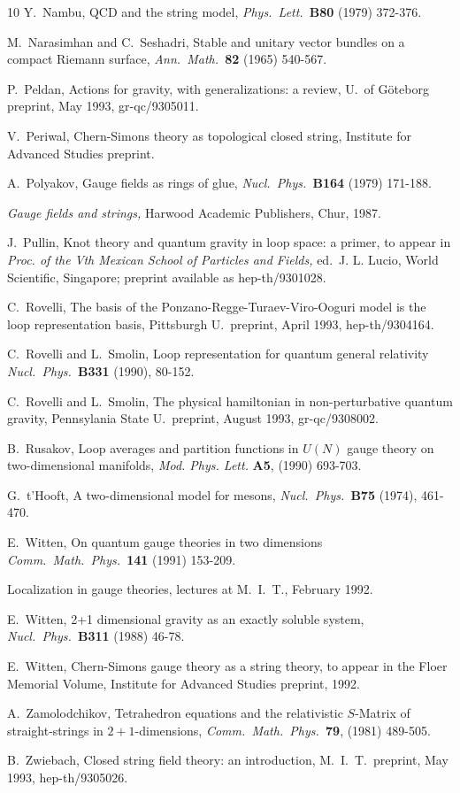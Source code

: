 \documentclass[12pt]{article}
\begin{document}
\begin{thebibliography} {10}
 Y.\ Nambu, QCD and the string model, {\sl Phys.\ Lett.\
}{\bf B80} (1979) 372-376.

 M.\ Narasimhan and C.\ Seshadri, Stable and unitary vector
bundles on a compact Riemann surface, {\sl Ann.\ Math.\ }{\bf 82} (1965)
540-567.

 P.\ Peldan, Actions for gravity, with generalizations:
a review, U.\ of G\"oteborg preprint, May 1993, gr-qc/9305011.

 V.\ Periwal, Chern-Simons theory as topological closed
string, Institute for Advanced Studies preprint.

 A.\ Polyakov, Gauge fields as rings of glue, {\sl
Nucl.\ Phys.\ }{\bf  B164} (1979) 171-188.

{\sl Gauge fields and strings,} Harwood Academic Publishers, Chur, 1987.

  J.\ Pullin, Knot theory and quantum gravity in loop
space: a primer, to appear in {\sl Proc. of the Vth Mexican School of
Particles and Fields,} ed.\ J. L. Lucio, World Scientific, Singapore;
preprint available as hep-th/9301028.

 C.\ Rovelli, The basis of the
Ponzano-Regge-Turaev-Viro-Ooguri model is the loop representation basis,
Pittsburgh U.\ preprint, April 1993, hep-th/9304164.

  C.\ Rovelli and L.\ Smolin, Loop representation for
quantum general relativity {\sl Nucl.\ Phys.\ }{\bf B331} (1990),
80-152.

C.\ Rovelli and L.\ Smolin,
The physical hamiltonian in non-perturbative quantum gravity, Pennsylania
State U.\ preprint, August 1993, gr-qc/9308002.

  B.\ Rusakov, Loop averages and partition functions in
$U(N)$ gauge theory on two-dimensional manifolds, {\em Mod. Phys. Lett.}
{\bf A5}, (1990) 693-703.

 G.\ t'Hooft, A two-dimensional model for mesons, {\sl
Nucl.\ Phys.\ }{\bf B75} (1974), 461-470.

  E.\  Witten, On quantum gauge theories in two
dimensions {\sl Comm.\ Math.\ Phys.\ }{\bf 141} (1991) 153-209.

Localization in gauge theories, lectures at M.\ I.\ T., February 1992.

 E.\ Witten, 2+1 dimensional gravity as an exactly
soluble system, {\sl Nucl.\ Phys.\ }{\bf B311} (1988) 46-78.

 E.\ Witten, Chern-Simons gauge theory as a string theory,
to appear in the Floer Memorial Volume, Institute for Advanced
Studies preprint, 1992.

 A.\ Zamolodchikov, Tetrahedron equations and the
relativistic $S$-Matrix of straight-strings in $2+1$-dimensions,
{\sl Comm.\ Math.\ Phys.\ }{\bf 79}, (1981) 489-505.

 B.\ Zwiebach, Closed string field theory: an
introduction, M.\ I.\ T.\ preprint, May 1993, hep-th/9305026.

\end{thebibliography}
\end{document}
